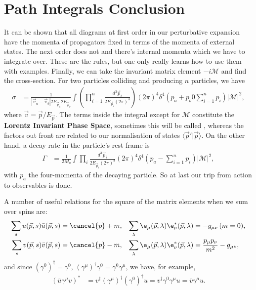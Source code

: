 \documentclass[relqm.tex]{subfiles}
\begin{document}
\section{Path Integrals Conclusion}
It can be shown that all diagrams at first order in our perturbative expansion have the momenta of propagators fixed in terms of the momenta of external states. 
The next order does not and there's internal momenta which we have to integrate over. 
These are the rules, but one only really learns how to use them with examples. 
Finally, we can take the invariant matrix element $-i\mathcal{M}$ and find the cross-section. 
For two particles colliding and producing $n$ particles, we have
\begin{align}
    \sigma &= \frac{1}{|\vec{v}_a-\vec{v}_b|2E_{\vec{p}_a}2E_{\vec{p}_b}} \int \left(\prod_{i=1}^n\frac{d^3\vec{p}_i}{2E_{\vec{p}_i}(2\pi)^3}\right)(2\pi)^4\delta^4\left(p_a+p_b0\sum_{i=1}^np_i\right)|\mathcal{M}|^2,
\end{align}
where $\vec{v}=\vec{p}/E_{\vec{p}}$.
The terms inside the integral except for $\mathcal{M}$ constitute the \textbf{Lorentz Invariant Phase Space}, sometimes this will be called \lips, whereas the factors out front are related to our normalisation of states $\langle\vec{p}'|\vec{p}\rangle$. 
On the other hand, a decay rate in the particle's rest frame is
\begin{align}
    \Gamma &= \frac{1}{2M_a}\int \prod_i \frac{d^3\vec{p}_i}{2E_{\vec{p}_i}(2\pi)^3}(2\pi)^4\delta^4\left(p_a-\sum_{i=1}^n p_i\right)|\mathcal{M}|^2,
\end{align}
with $p_a$ the four-momenta of the decaying particle. 
So at last our trip from action to observables is done. 

A number of useful relations for the square of the matrix elements when we sum over spins are:
\begin{align}
    \sum_s u(\vec{p},s)\bar{u}(\vec{p},s) &= \cancel{p}+m, & \sum_{\lambda}\e_\mu(\vec{p},\lambda)\e_\nu^*(\vec{p},\lambda)&=-g_{\mu\nu}\,(m=0), \\
    \sum_s v(\vec{p},s)\bar{v}(\vec{p},s) &= \cancel{p}-m, & \sum_\lambda \e_\mu(\vec{p},\lambda)\e_\nu^*(\vec{p},\lambda) &= \frac{p_\mu p_\nu}{m^2}-g_{\mu\nu},
\end{align}
and since $(\gamma^0)^\dagger = \gamma^0$, $(\gamma^\mu)^\dagger \gamma^0 = \gamma^0\gamma^\mu$, we have, for example, 
\begin{align}
    (\bar{u}\gamma^\mu v)^* &= v^\dagger (\gamma^\mu)^\dagger(\gamma^0)^\dagger u = v^\dagger \gamma^0\gamma^\mu u = \bar{v}\gamma^\mu u.
\end{align}
\end{document}
